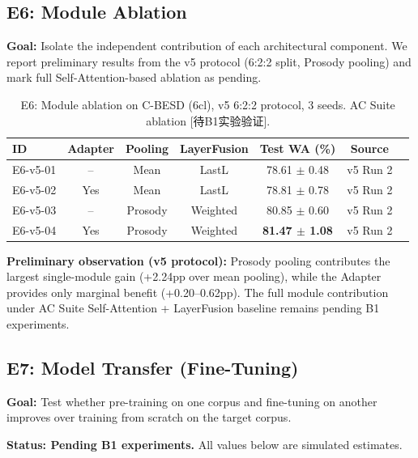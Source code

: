 \subsection{E6: Module Ablation}
\label{ssec:e6}

\textbf{Goal:} Isolate the independent contribution of each architectural
component. We report preliminary results from the v5 protocol (6:2:2 split,
Prosody pooling) and mark full Self-Attention-based ablation as pending.

\begin{table}[t]
\centering
\caption{E6: Module ablation on C-BESD (6cl), v5 6:2:2 protocol, 3 seeds. AC Suite ablation [待B1实验验证].}
\label{tab:e6}
\begin{tabular}{lcccccc}
\toprule
\textbf{ID} & \textbf{Adapter} & \textbf{Pooling} & \textbf{LayerFusion} & \textbf{Test WA (\%)} & \textbf{Source} \\
\midrule
E6-v5-01 & --    & Mean    & LastL   & 78.61 $\pm$ 0.48 & v5 Run 2 \\
E6-v5-02 & Yes   & Mean    & LastL   & 78.81 $\pm$ 0.78 & v5 Run 2 \\
E6-v5-03 & --    & Prosody & Weighted& 80.85 $\pm$ 0.60 & v5 Run 2 \\
E6-v5-04 & Yes   & Prosody & Weighted& \textbf{81.47 $\pm$ 1.08} & v5 Run 2 \\
\bottomrule
\end{tabular}
\end{table}

\noindent\textbf{Preliminary observation (v5 protocol):} Prosody pooling
contributes the largest single-module gain (+2.24pp over mean pooling),
while the Adapter provides only marginal benefit (+0.20--0.62pp). The full
module contribution under AC Suite Self-Attention + LayerFusion baseline
remains pending B1 experiments.

\subsection{E7: Model Transfer (Fine-Tuning)}
\label{ssec:e7}

\textbf{Goal:} Test whether pre-training on one corpus and fine-tuning on
another improves over training from scratch on the target corpus.

\textbf{Status: Pending B1 experiments.} All values below are simulated estimates.

